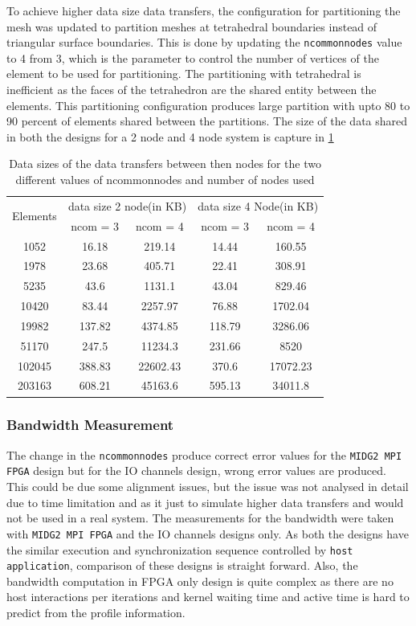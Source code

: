 To achieve higher data size data transfers, the configuration for partitioning the mesh
was updated to partition meshes at tetrahedral boundaries instead of triangular surface boundaries.
This is done by updating the \texttt{ncommonnodes} value to 4 from 3, which is the parameter
to control the number of vertices of the element to be used for partitioning. The partitioning
with tetrahedral is inefficient as the faces of the tetrahedron are the shared
entity between the elements. This partitioning configuration produces large partition
with upto 80 to 90 percent of elements shared between the partitions. The
size of the data shared in both the designs for a 2 node and 4 node system is
capture in \ref{tab:sizes_var}
\begin{table}[ht]
    \centering
    \caption{Data sizes of the data transfers between then nodes for the two different values of ncommonnodes and number of nodes used}
    \label{tab:sizes_var}
    \begin{tabular}{|ccccc|}
    \hline
    \multirow{2}{*}{Elements} & \multicolumn{2}{c|}{data size 2 node(in KB)} & \multicolumn{2}{c|}{data size 4 Node(in KB)} \\ \cline{2-5}
     & ncom = 3 & ncom = 4 & ncom = 3 & ncom = 4 \\ \hline
    1052 & 16.18 & 219.14 & 14.44 & 160.55 \\ \hline
    1978 & 23.68 & 405.71 & 22.41 & 308.91 \\ \hline
    5235 & 43.6 & 1131.1 & 43.04 & 829.46 \\ \hline
    10420 & 83.44 & 2257.97 & 76.88 & 1702.04 \\ \hline
    19982 & 137.82 & 4374.85 & 118.79 & 3286.06 \\ \hline
    51170 & 247.5 & 11234.3 & 231.66 & 8520 \\ \hline
    102045 & 388.83 & 22602.43 & 370.6 & 17072.23 \\ \hline
    203163 & 608.21 & 45163.6 & 595.13 & 34011.8 \\ \hline
    \end{tabular}%
\end{table}

\subsubsection{Bandwidth Measurement}
The change in the \texttt{ncommonnodes} produce correct error values for the \texttt{MIDG2 MPI FPGA} design but
for the IO channels design, wrong error values are produced. This could be due some alignment
issues, but the issue was not analysed in detail due to time limitation and as it just to simulate
higher data transfers and would not be used in a real system. The measurements for the bandwidth
were taken with \texttt{MIDG2 MPI FPGA} and the IO channels designs only. As both the designs
have the similar execution and synchronization sequence controlled by \texttt{host application}, comparison of these designs
is straight forward. Also, the bandwidth computation in FPGA only design
is quite complex as there are no host interactions per iterations and kernel waiting time
and active time is hard to predict from the profile information.

